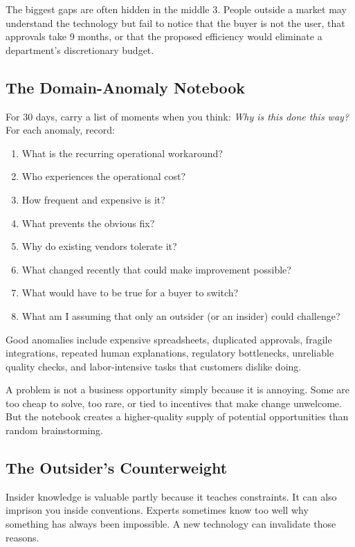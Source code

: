 The biggest gaps are often hidden in the middle 3. People outside a market may understand the technology but fail to notice that the buyer is not the user, that approvals take 9 months, or that the proposed efficiency would eliminate a department's discretionary budget.

\subsection{The Domain-Anomaly Notebook}

For 30 days, carry a list of moments when you think: \textit{Why is this done this way?} For each anomaly, record:

\begin{enumerate}[label=\textbf{\arabic*.},leftmargin=11pt,itemsep=1.5pt,topsep=1.5pt,parsep=0pt]
  \item What is the recurring operational workaround?
  \item Who experiences the operational cost?
  \item How frequent and expensive is it?
  \item What prevents the obvious fix?
  \item Why do existing vendors tolerate it?
  \item What changed recently that could make improvement possible?
  \item What would have to be true for a buyer to switch?
  \item What am I assuming that only an outsider (or an insider) could challenge?
\end{enumerate}

Good anomalies include expensive spreadsheets, duplicated approvals, fragile integrations, repeated human explanations, regulatory bottlenecks, unreliable quality checks, and labor-intensive tasks that customers dislike doing.

A problem is not a business opportunity simply because it is annoying. Some are too cheap to solve, too rare, or tied to incentives that make change unwelcome. But the notebook creates a higher-quality supply of potential opportunities than random brainstorming.

\subsection{The Outsider's Counterweight}

Insider knowledge is valuable partly because it teaches constraints. It can also imprison you inside conventions. Experts sometimes know too well why something has always been impossible. A new technology can invalidate those reasons.

